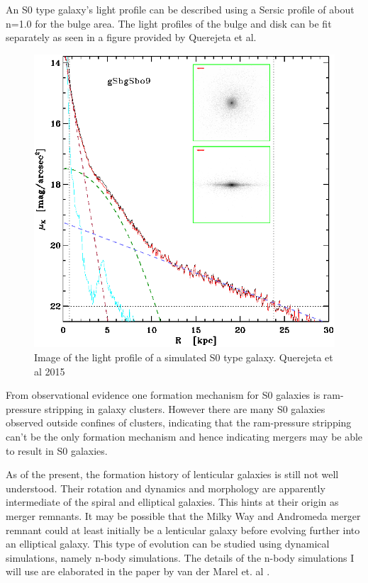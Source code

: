 \documentclass[%
 reprint,
 amsmath,amssymb,
 aps,
]{revtex4-2}
\begin{document}
 An S0 type galaxy's light profile can be described using a Sersic profile of about n=1.0 for the bulge area\citep{Querejeta_2015}. The light profiles of the bulge and disk can be fit separately as seen in a figure provided by Querejeta et al\cite{Querejeta_2015}.
\begin{figure}
    \centering
    \includegraphics{aa24303-14-fig12.eps}
    \caption{Image of the light profile of a simulated S0 type galaxy. Querejeta et al 2015}
    \label{profile_fig}
\end{figure}
From observational evidence one formation mechanism for S0 galaxies is ram-pressure stripping in galaxy clusters\citep{Querejeta_2015}. However there are many S0 galaxies observed outside confines of clusters, indicating that the ram-pressure stripping can't be the only formation mechanism and hence indicating mergers may be able to result in S0 galaxies.

As of the present, the formation history of lenticular galaxies is still not well understood. Their rotation and dynamics and morphology are apparently intermediate of the spiral and elliptical galaxies. This hints at their origin as merger remnants. It may be possible that the Milky Way and Andromeda merger remnant could at least initially be a lenticular galaxy before evolving further into an elliptical galaxy. This type of evolution can be studied using dynamical simulations, namely n-body simulations. The details of the n-body simulations I will use are elaborated in the paper by van der Marel et. al \citep{van_der_Marel_2012,Sohn_2012}.
\end{document}
